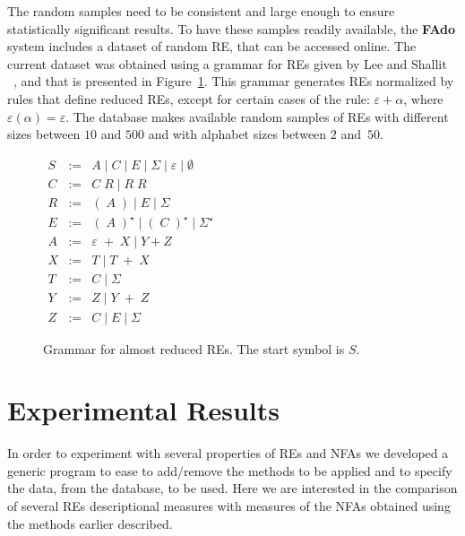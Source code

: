 \documentclass{llncs}
\newcommand{\FAdo}{{\bf FAdo}\xspace}
\newcommand{\nfas}{NFAs\xspace}
\newcommand{\re}{RE\xspace}
\newcommand{\res}{REs\xspace}
\newcommand{\Alphabet}{\Sigma}
\begin{document}
The random samples need to be consistent and large enough to ensure
statistically significant results. To have these samples readily
available, the \FAdo system includes a dataset of random \re, that can
be accessed online. The current dataset was obtained using a grammar
for \res given by Lee and Shallit
~\cite{lee05:_enumer_regul_expres_and_their_languag_c}, and that is
presented in Figure~\ref{fig:grammar}. This grammar generates \res
normalized by rules that define reduced \res, except for certain cases
of the rule: $\varepsilon+\alpha$, where
$\varepsilon(\alpha)=\varepsilon$. The database makes available random
samples of \res with different sizes between $10$ and $500$ and with
alphabet sizes between $2$ and~$50$.
\begin{figure}
  \centering
  {\small$
  \begin{array}{lcl}
    S &:=& A \mid C \mid E \mid \Alphabet \mid \varepsilon \mid \emptyset\\
                          C &:=& C\; R \mid R\; R\\
                          R &:=& (\; A\; ) \mid E \mid \Alphabet \\
                          E &:=& (\; A \;)^\star \mid (\; C\; )^\star \mid \Alphabet ^\star\\
                          A &:=& \varepsilon\; +\; X \mid Y + Z\\
                          X &:=& T \mid T\; +\; X\\
                          T &:=& C \mid \Alphabet\\
                          Y &:=& Z \mid Y\; +\; Z\\
                          Z &:=& C \mid E \mid \Alphabet
  \end{array}
$}
  \caption{Grammar for almost reduced \res. The start symbol is $S$.}
  \label{fig:grammar}
\end{figure}

\section{Experimental Results}

In order to experiment with several properties of \res and \nfas we
developed a generic program to ease to add/remove the methods to be
applied and to specify the data, from the database, to be used. Here
we are interested in the comparison of several \res descriptional
measures with measures of the \nfas obtained using the methods earlier
described.
\end{document}
